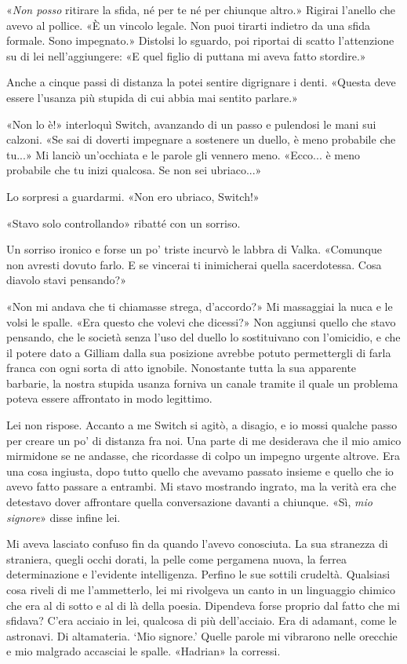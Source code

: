«\emph{Non posso} ritirare la sfida, né per te né per chiunque altro.»
Rigirai l'anello che avevo al pollice. «È un vincolo legale. Non puoi
tirarti indietro da una sfida formale. Sono impegnato.» Distolsi lo
sguardo, poi riportai di scatto l'attenzione su di lei nell'aggiungere:
«E quel figlio di puttana mi aveva fatto stordire.»

Anche a cinque passi di distanza la potei sentire digrignare i denti.
«Questa deve essere l'usanza più stupida di cui abbia mai sentito
parlare.»

«Non lo è!» interloquì Switch, avanzando di un passo e pulendosi le mani
sui calzoni. «Se sai di doverti impegnare a sostenere un duello, è meno
probabile che tu...» Mi lanciò un'occhiata e le parole gli vennero meno.
«Ecco... è meno probabile che tu inizi qualcosa. Se non sei ubriaco...»

Lo sorpresi a guardarmi. «Non ero ubriaco, Switch!»

«Stavo solo controllando» ribatté con un sorriso.

Un sorriso ironico e forse un po' triste incurvò le labbra di Valka.
«Comunque non avresti dovuto farlo. E se vincerai ti inimicherai quella
sacerdotessa. Cosa diavolo stavi pensando?»

«Non mi andava che ti chiamasse strega, d'accordo?» Mi massaggiai la
nuca e le volsi le spalle. «Era questo che volevi che dicessi?» Non
aggiunsi quello che stavo pensando, che le società senza l'uso del
duello lo sostituivano con l'omicidio, e che il potere dato a Gilliam
dalla sua posizione avrebbe potuto permettergli di farla franca con ogni
sorta di atto ignobile. Nonostante tutta la sua apparente barbarie, la
nostra stupida usanza forniva un canale tramite il quale un problema
poteva essere affrontato in modo legittimo.

Lei non rispose. Accanto a me Switch si agitò, a disagio, e io mossi
qualche passo per creare un po' di distanza fra noi. Una parte di me
desiderava che il mio amico mirmidone se ne andasse, che ricordasse di
colpo un impegno urgente altrove. Era una cosa ingiusta, dopo tutto
quello che avevamo passato insieme e quello che io avevo fatto passare a
entrambi. Mi stavo mostrando ingrato, ma la verità era che detestavo
dover affrontare quella conversazione davanti a chiunque. «Sì, \emph{mio
	signore}» disse infine lei.

Mi aveva lasciato confuso fin da quando l'avevo conosciuta. La sua
stranezza di straniera, quegli occhi dorati, la pelle come pergamena
nuova, la ferrea determinazione e l'evidente intelligenza. Perfino le
sue sottili crudeltà. Qualsiasi cosa riveli di me l'ammetterlo, lei mi
rivolgeva un canto in un linguaggio chimico che era al di sotto e al di
là della poesia. Dipendeva forse proprio dal fatto che mi sfidava? C'era
acciaio in lei, qualcosa di più dell'acciaio. Era di adamant, come le
astronavi. Di altamateria. `Mio signore.' Quelle parole mi vibrarono
nelle orecchie e mio malgrado accasciai le spalle. «Hadrian» la
corressi.

